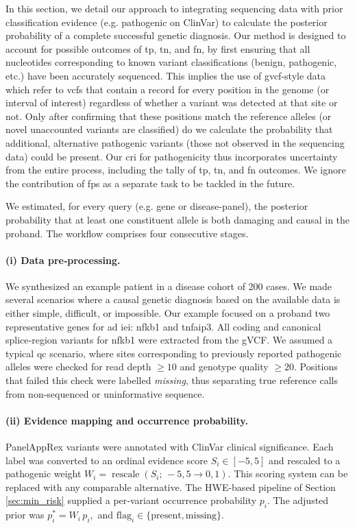 In this section, we detail our approach to integrating sequencing data with prior classification evidence (e.g. pathogenic on ClinVar) to calculate the posterior probability of a complete successful genetic diagnosis.
Our method is designed to account for possible outcomes of 
\ac{tp},
\ac{tn},
and \ac{fn},
by first ensuring that all nucleotides corresponding to known variant classifications (benign, pathogenic, etc.) have been accurately sequenced. 
This implies the use of \ac{gvcf}-style data which refer to \ac{vcf}s that contain a record for every position in the genome (or interval of interest) regardless of whether a variant was detected at that site or not.
Only after confirming that these positions match the reference alleles (or novel unaccounted variants are classified) do we calculate the probability that additional, alternative pathogenic variants (those not observed in the sequencing data) could be present. 
Our \ac{cri} for pathogenicity thus incorporates uncertainty from the entire process, including the tally of \ac{tp}, \ac{tn}, and \ac{fn} outcomes.
We ignore the contribution of \ac{fp}s  as a separate task to be tackled in the future.

We estimated, for every query (e.g. gene or disease-panel), the posterior probability that at least one constituent allele is both damaging and causal in the proband.  
The workflow comprises four consecutive stages.

\paragraph{(i) Data pre‑processing.}
We synthesized an example patient in a disease cohort of 200 cases.
We made several scenarios where a causal genetic diagnosis based on the available data is either simple, difficult, or impossible.
Our example focused on a proband two representative genes for \ac{ad} \ac{iei}: \ac{nfkb1} and  \ac{tnfaip3}.
All coding and canonical splice‑region variants for \ac{nfkb1} were extracted from the gVCF.  
We assumed a typical \ac{qc} scenario, where sites corresponding to previously reported pathogenic alleles were checked for read depth \mbox{$\ge\!10$} and genotype quality \mbox{$\ge\!20$}.  
Positions that failed this check were labelled \emph{missing}, thus separating true reference calls from non-sequenced or uninformative sequence.

\paragraph{(ii) Evidence mapping and occurrence probability.}
PanelAppRex variants were annotated with ClinVar clinical significance.  Each label was converted to an ordinal evidence score $S_i\in[-5,5]$ and rescaled to a pathogenic weight $W_i=\operatorname{rescale}(S_i;\,-5,5\rightarrow0,1)$.  
This scoring system can be replaced with any comparable alternative.
The HWE-based pipeline of Section \ref{sec:min_risk} supplied a per‑variant occurrence probability $p_i$.  The adjusted prior was
$p_{i}^{\ast}=W_i\,p_i,$ and
$\mathrm{flag}_i\in\{\text{present},\text{missing}\}$.

